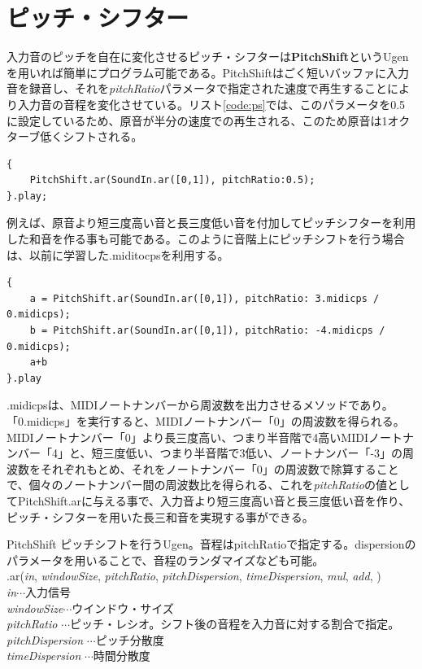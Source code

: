 \documentclass{jsarticle}
\begin{document}
\section{ピッチ・シフター}
入力音のピッチを自在に変化させるピッチ・シフターは{\bf PitchShift}というUgenを用いれば簡単にプログラム可能である。PitchShiftはごく短いバッファに入力音を録音し、それを{\it pitchRatio}パラメータで指定された速度で再生することにより入力音の音程を変化させている。リスト\ref{code:ps}では、このパラメータを0.5に設定しているため、原音が半分の速度での再生される、このため原音は1オクターブ低くシフトされる。

\begin{lstlisting}[caption=ピッチシフター, label=code:ps]
{
	PitchShift.ar(SoundIn.ar([0,1]), pitchRatio:0.5);
}.play;
\end{lstlisting}

例えば、原音より短三度高い音と長三度低い音を付加してピッチシフターを利用した和音を作る事も可能である。このように音階上にピッチシフトを行う場合は、以前に学習した.miditocpsを利用する。

\begin{lstlisting}[caption=ピッチシフターによる和音, label=code:ps_chord]
{
	a = PitchShift.ar(SoundIn.ar([0,1]), pitchRatio: 3.midicps / 0.midicps);
	b = PitchShift.ar(SoundIn.ar([0,1]), pitchRatio: -4.midicps / 0.midicps);
	a+b
}.play
\end{lstlisting}

.midicpsは、MIDIノートナンバーから周波数を出力させるメソッドであり。「0.midicps」を実行すると、MIDIノートナンバー「0」の周波数を得られる。MIDIノートナンバー「0」より長三度高い、つまり半音階で4高いMIDIノートナンバー「4」と、短三度低い、つまり半音階で3低い、ノートナンバー「-3」の周波数をそれぞれもとめ、それをノートナンバー「0」の周波数で除算することで、個々のノートナンバー間の周波数比を得られる、これを{\it pitchRatio}の値としてPitchShift.arに与える事で、入力音より短三度高い音と長三度低い音を作り、ピッチ・シフターを用いた長三和音を実現する事ができる。

\begin{itembox}[l]{PitchShift}
{\footnotesize 
ピッチシフトを行うUgen。音程はpitchRatioで指定する。dispersionのパラメータを用いることで、音程のランダマイズなども可能。\\
.ar({\it in}, {\it windowSize}, {\it pitchRatio}, {\it pitchDispersion}, {\it timeDispersion}, {\it mul}, {\it add}, )\\

{\it in}$\cdots$入力信号\\
{\it windowSize}$\cdots$ウインドウ・サイズ\\
{\it pitchRatio} $\cdots$ピッチ・レシオ。シフト後の音程を入力音に対する割合で指定。\\
{\it pitchDispersion} $\cdots$ピッチ分散度\\
{\it timeDispersion} $\cdots$時間分散度\\
}
\end{itembox}
\end{document}
